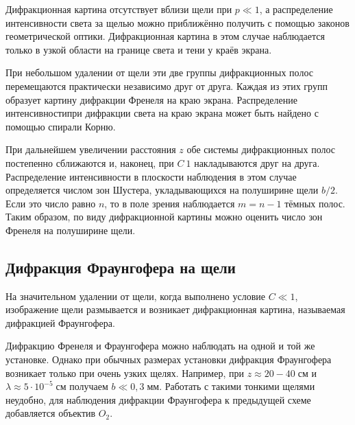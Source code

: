 Дифракционная картина отсутствует вблизи щели при $p \ll 1$, а распределение интенсивности света за щелью можно приближённо получить с помощью законов геометрической оптики. Дифракционная картина в этом случае наблюдается только в узкой области на границе света и тени у краёв экрана.

При небольшом удалении от щели эти две группы дифракционных полос перемещаются практически независимо друг от друга. Каждая из этих групп образует картину дифракции Френеля на краю экрана. Распределение интенсивностипри дифракции света на краю экрана может быть найдено с помощью спирали Корню.

При дальнейшем увеличении расстояния $z$ обе системы дифракционных полос постепенно сближаются и, наконец, при $C ~ 1$ накладываются друг на друга. Распределение интенсивности в плоскости наблюдения в этом случае определяется числом зон Шустера,  укладывающихся на полуширине щели $b / 2$. Если это число равно $n$, то в поле зрения наблюдается $m = n - 1$ тёмных полос. Таким образом, по виду дифракционной картины можно оценить число зон Френеля на полуширине щели.

\subsection{Дифракция Фраунгофера на щели}
\begin{figure}[ht!]
\end{figure}

На значительном удалении от щели, когда выполнено условие $C \ll 1$, изображение щели размывается и возникает дифракционная картина, называемая дифракцией Фраунгофера.

Дифракцию Френеля и Фраунгофера можно наблюдать на одной и той же установке. Однако при обычных размерах установки дифракция Фраунгофера возникает только при очень узких щелях. Например, при $z \approx 20-40\;\text{см}$ и $\lambda \approx 5\cdot 10^{-5}\;\text{см}$ получаем $b \ll 0{,}3\;\text{мм}$. Работать с такими тонкими щелями неудобно, для наблюдения дифракции Фраунгофера к предыдущей схеме добавляется объектив $O_{2}$.

